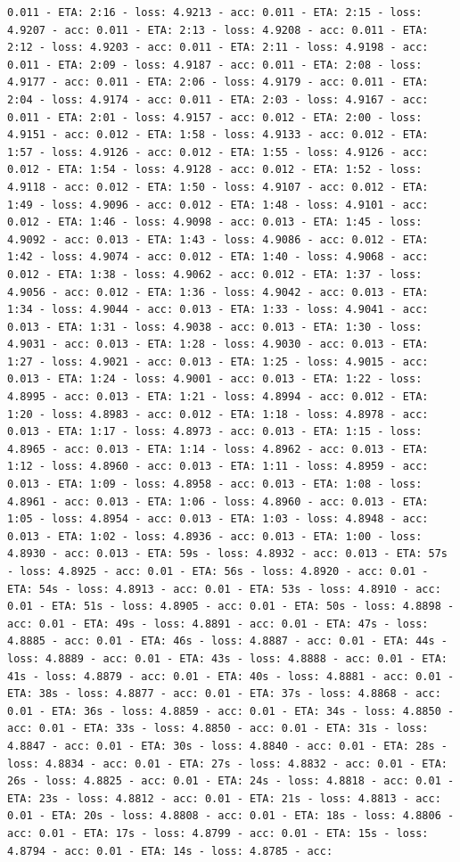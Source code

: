\documentclass[11pt]{article}
\begin{document}
\begin{Verbatim}[commandchars=\\\{\}]
0.011 - ETA: 2:16 - loss: 4.9213 - acc: 0.011 - ETA: 2:15 - loss: 4.9207 - acc: 0.011 - ETA: 2:13 - loss: 4.9208 - acc: 0.011 - ETA: 2:12 - loss: 4.9203 - acc: 0.011 - ETA: 2:11 - loss: 4.9198 - acc: 0.011 - ETA: 2:09 - loss: 4.9187 - acc: 0.011 - ETA: 2:08 - loss: 4.9177 - acc: 0.011 - ETA: 2:06 - loss: 4.9179 - acc: 0.011 - ETA: 2:04 - loss: 4.9174 - acc: 0.011 - ETA: 2:03 - loss: 4.9167 - acc: 0.011 - ETA: 2:01 - loss: 4.9157 - acc: 0.012 - ETA: 2:00 - loss: 4.9151 - acc: 0.012 - ETA: 1:58 - loss: 4.9133 - acc: 0.012 - ETA: 1:57 - loss: 4.9126 - acc: 0.012 - ETA: 1:55 - loss: 4.9126 - acc: 0.012 - ETA: 1:54 - loss: 4.9128 - acc: 0.012 - ETA: 1:52 - loss: 4.9118 - acc: 0.012 - ETA: 1:50 - loss: 4.9107 - acc: 0.012 - ETA: 1:49 - loss: 4.9096 - acc: 0.012 - ETA: 1:48 - loss: 4.9101 - acc: 0.012 - ETA: 1:46 - loss: 4.9098 - acc: 0.013 - ETA: 1:45 - loss: 4.9092 - acc: 0.013 - ETA: 1:43 - loss: 4.9086 - acc: 0.012 - ETA: 1:42 - loss: 4.9074 - acc: 0.012 - ETA: 1:40 - loss: 4.9068 - acc: 0.012 - ETA: 1:38 - loss: 4.9062 - acc: 0.012 - ETA: 1:37 - loss: 4.9056 - acc: 0.012 - ETA: 1:36 - loss: 4.9042 - acc: 0.013 - ETA: 1:34 - loss: 4.9044 - acc: 0.013 - ETA: 1:33 - loss: 4.9041 - acc: 0.013 - ETA: 1:31 - loss: 4.9038 - acc: 0.013 - ETA: 1:30 - loss: 4.9031 - acc: 0.013 - ETA: 1:28 - loss: 4.9030 - acc: 0.013 - ETA: 1:27 - loss: 4.9021 - acc: 0.013 - ETA: 1:25 - loss: 4.9015 - acc: 0.013 - ETA: 1:24 - loss: 4.9001 - acc: 0.013 - ETA: 1:22 - loss: 4.8995 - acc: 0.013 - ETA: 1:21 - loss: 4.8994 - acc: 0.012 - ETA: 1:20 - loss: 4.8983 - acc: 0.012 - ETA: 1:18 - loss: 4.8978 - acc: 0.013 - ETA: 1:17 - loss: 4.8973 - acc: 0.013 - ETA: 1:15 - loss: 4.8965 - acc: 0.013 - ETA: 1:14 - loss: 4.8962 - acc: 0.013 - ETA: 1:12 - loss: 4.8960 - acc: 0.013 - ETA: 1:11 - loss: 4.8959 - acc: 0.013 - ETA: 1:09 - loss: 4.8958 - acc: 0.013 - ETA: 1:08 - loss: 4.8961 - acc: 0.013 - ETA: 1:06 - loss: 4.8960 - acc: 0.013 - ETA: 1:05 - loss: 4.8954 - acc: 0.013 - ETA: 1:03 - loss: 4.8948 - acc: 0.013 - ETA: 1:02 - loss: 4.8936 - acc: 0.013 - ETA: 1:00 - loss: 4.8930 - acc: 0.013 - ETA: 59s - loss: 4.8932 - acc: 0.013 - ETA: 57s - loss: 4.8925 - acc: 0.01 - ETA: 56s - loss: 4.8920 - acc: 0.01 - ETA: 54s - loss: 4.8913 - acc: 0.01 - ETA: 53s - loss: 4.8910 - acc: 0.01 - ETA: 51s - loss: 4.8905 - acc: 0.01 - ETA: 50s - loss: 4.8898 - acc: 0.01 - ETA: 49s - loss: 4.8891 - acc: 0.01 - ETA: 47s - loss: 4.8885 - acc: 0.01 - ETA: 46s - loss: 4.8887 - acc: 0.01 - ETA: 44s - loss: 4.8889 - acc: 0.01 - ETA: 43s - loss: 4.8888 - acc: 0.01 - ETA: 41s - loss: 4.8879 - acc: 0.01 - ETA: 40s - loss: 4.8881 - acc: 0.01 - ETA: 38s - loss: 4.8877 - acc: 0.01 - ETA: 37s - loss: 4.8868 - acc: 0.01 - ETA: 36s - loss: 4.8859 - acc: 0.01 - ETA: 34s - loss: 4.8850 - acc: 0.01 - ETA: 33s - loss: 4.8850 - acc: 0.01 - ETA: 31s - loss: 4.8847 - acc: 0.01 - ETA: 30s - loss: 4.8840 - acc: 0.01 - ETA: 28s - loss: 4.8834 - acc: 0.01 - ETA: 27s - loss: 4.8832 - acc: 0.01 - ETA: 26s - loss: 4.8825 - acc: 0.01 - ETA: 24s - loss: 4.8818 - acc: 0.01 - ETA: 23s - loss: 4.8812 - acc: 0.01 - ETA: 21s - loss: 4.8813 - acc: 0.01 - ETA: 20s - loss: 4.8808 - acc: 0.01 - ETA: 18s - loss: 4.8806 - acc: 0.01 - ETA: 17s - loss: 4.8799 - acc: 0.01 - ETA: 15s - loss: 4.8794 - acc: 0.01 - ETA: 14s - loss: 4.8785 - acc: 
\end{Verbatim}
\end{document}
